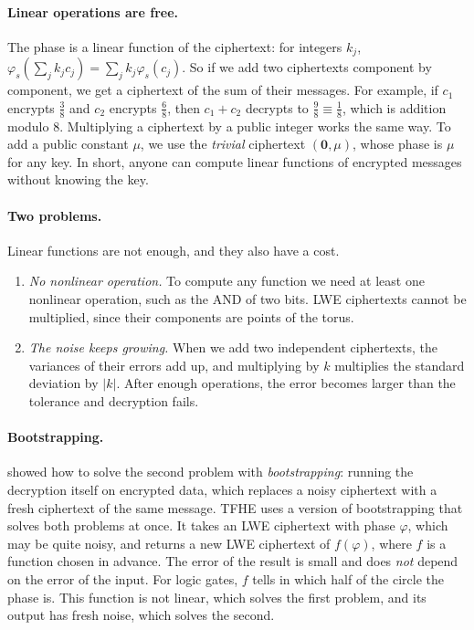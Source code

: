\documentclass[12pt]{article}
\theoremstyle{plain}
\theoremstyle{definition}
\begin{document}
\paragraph{Linear operations are free.}
The phase is a linear function of the ciphertext: for integers $k_j$,
$\varphi_s(\sum_jk_jc_j)=\sum_jk_j\varphi_s(c_j)$. So if we add two ciphertexts
component by component, we get a ciphertext of the sum of their messages. For
example, if $c_1$ encrypts $\frac38$ and $c_2$ encrypts $\frac68$, then $c_1+c_2$
decrypts to $\frac98\equiv\frac18$, which is addition modulo $8$. Multiplying a
ciphertext by a public integer works the same way. To add a public constant
$\mu$, we use the \emph{trivial} ciphertext $(\mathbf0,\mu)$, whose phase is
$\mu$ for any key. In short, anyone can compute linear functions of encrypted
messages without knowing the key.

\paragraph{Two problems.}
Linear functions are not enough, and they also have a cost.
\begin{enumerate}
  \item \emph{No nonlinear operation.} To compute any function we need at least
        one nonlinear operation, such as the AND of two bits. LWE ciphertexts
        cannot be multiplied, since their components are points of the torus.
  \item \emph{The noise keeps growing.} When we add two independent
        ciphertexts, the variances of their errors add up, and multiplying by
        $k$ multiplies the standard deviation by $|k|$. After enough
        operations, the error becomes larger than the tolerance and decryption
        fails.
\end{enumerate}

\paragraph{Bootstrapping.}
\cite{gentry2009fhe} showed how to solve the second problem with
\emph{bootstrapping}: running the decryption itself on encrypted data, which
replaces a noisy ciphertext with a fresh ciphertext of the same message. TFHE
uses a version of bootstrapping that solves both problems at once. It takes an
LWE ciphertext with phase $\varphi$, which may be quite noisy, and returns a new
LWE ciphertext of $f(\varphi)$, where $f$ is a function chosen in advance. The
error of the result is small and does \emph{not} depend on the error of the
input. For logic gates, $f$ tells in which half of the circle the phase is.
This function is not linear, which solves the first problem, and its output
has fresh noise, which solves the second.
\end{document}
